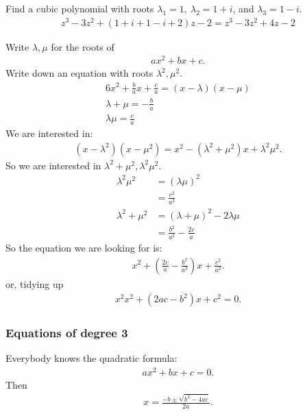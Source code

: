 \begin{nex}
	\item
	Find a cubic polynomial with roots $\lambda_1 = 1,~ \lambda_2 = 1+i$, and  $\lambda_3 = 1-i$.
	\begin{align*}
	z^3 - 3z^2 + (1+i+1-i+2)z - 2 = z^3-3z^2 + 4z -2
	\end{align*}
	\item
	Write $\lambda, \mu$ for the roots of
	\begin{align*}
	ax^2+bx+c.
	\end{align*}
	Write down an equation with roots $\lambda^2, \mu^2$.
	\begin{align*}
	6x^2+\frac b a x + \frac c a = (x-\lambda)(x-\mu) \\
	\lambda + \mu = -\frac b a \\
	\lambda\mu = \frac c a
	\end{align*}
	We are interested in:
	\begin{align*}
	(x-\lambda^2)(x-\mu^2) = x^2 -(\lambda^2+\mu^2)x + \lambda^2\mu^2.
	\end{align*}
	So we are interested in $\lambda^2+\mu^2, \lambda^2\mu^2$. 
	\begin{align*}
	\lambda^2\mu^2 & = (\lambda\mu)^2 \\
	& = \frac{c^2}{a^2} \\
	\lambda^2+\mu^2 & = (\lambda+\mu)^2 - 2 \lambda\mu \\
	& = \frac {b^2}{a^2} - \frac{2c} a
	\end{align*}
	So the equation we are looking for is:
	\begin{align*}
	x^2+ \left(\frac{2c}{a} - \frac{b^2}{a^2} \right) x + \frac{c^2}{a^2}.
	\end{align*}
	or, tidying up
	\begin{align*}
	x^2x^2 + (2ac-b^2)x + c^2=0.
	\end{align*}
\end{nex}

\subsubsection{Equations of degree 3}
Everybody knows the quadratic formula:
\begin{align*}
ax^2+bx+c=0.
\end{align*}
Then 
\begin{align*}
x= \frac{-b\pm\sqrt{b^2-4ac}}{2a}.
\end{align*}

